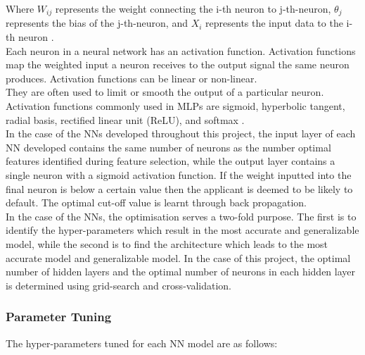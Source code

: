 \vspace{10pt}

Where $W_{ij}$ represents the weight connecting the i-th neuron to j-th-neuron, $\theta_j$ represents the bias of the j-th-neuron, and $X_i$ represents the input data to the i-th neuron \parencite{MLP}. \\

Each neuron in a neural network has an activation function. Activation functions map the weighted input a neuron receives to the output signal the same neuron produces. Activation functions can be linear or non-linear. \\

They are often used to limit or smooth the output of a particular neuron. Activation functions commonly used in MLPs are sigmoid, hyperbolic tangent, radial basis, rectified linear unit (ReLU), and softmax \parencite{activation_functions}. \\

In the case of the NNs developed throughout this project, the input layer of each NN developed contains the same number of neurons as the number optimal features identified during feature selection, while the output layer contains a single neuron with a sigmoid activation function. If the weight inputted into the final neuron is below a certain value then the applicant is deemed to be likely to default. The optimal cut-off value is learnt through back propagation. \\ 

In the case of the NNs, the optimisation serves a two-fold purpose. The first is to identify the hyper-parameters which result in the most accurate and generalizable model, while the second is to find the architecture which leads to the most accurate model and generalizable model. In the case of this project, the optimal number of hidden layers and  the optimal number of neurons in each hidden layer is determined using grid-search and cross-validation. 

\subsubsection{Parameter Tuning}

The hyper-parameters tuned for each NN model are as follows:

